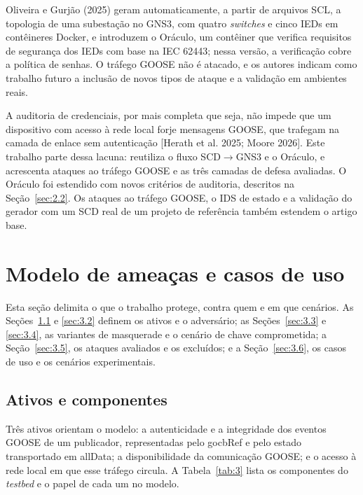 \documentclass[12pt]{article}
\newcommand{\cit}[2]{[#1]\nocite{#2}}
\newcommand{\citn}[2]{#1\nocite{#2}}
\begin{document}
\citn{Oliveira e Gurjão (2025)}{oliveira2025analisador} geram automaticamente, a partir de arquivos SCL, a topologia de uma subestação no GNS3, com quatro \emph{switches} e cinco IEDs em contêineres Docker, e introduzem o Oráculo, um contêiner que verifica requisitos de segurança dos IEDs com base na IEC 62443; nessa versão, a verificação cobre a política de senhas. O tráfego GOOSE não é atacado, e os autores indicam como trabalho futuro a inclusão de novos tipos de ataque e a validação em ambientes reais.

A auditoria de credenciais, por mais completa que seja, não impede que um dispositivo com acesso à rede local forje mensagens GOOSE, que trafegam na camada de enlace sem autenticação \cit{Herath et al. 2025; Moore 2026}{herath2025evaluation,moore2026anomaly}. Este trabalho parte dessa lacuna: reutiliza o fluxo SCD\ensuremath{\rightarrow}GNS3 e o Oráculo, e acrescenta ataques ao tráfego GOOSE e as três camadas de defesa avaliadas. O Oráculo foi estendido com novos critérios de auditoria, descritos na Seção~\ref{sec:2.2}. Os ataques ao tráfego GOOSE, o IDS de estado e a validação do gerador com um SCD real de um projeto de referência também estendem o artigo base.

\section{Modelo de ameaças e casos de uso}\label{sec:3}

Esta seção delimita o que o trabalho protege, contra quem e em que cenários. As Seções~\ref{sec:3.1} e \ref{sec:3.2} definem os ativos e o adversário; as Seções~\ref{sec:3.3} e \ref{sec:3.4}, as variantes de masquerade e o cenário de chave comprometida; a Seção~\ref{sec:3.5}, os ataques avaliados e os excluídos; e a Seção~\ref{sec:3.6}, os casos de uso e os cenários experimentais.

\subsection{Ativos e componentes}\label{sec:3.1}

Três ativos orientam o modelo: a autenticidade e a integridade dos eventos GOOSE de um publicador, representadas pelo gocbRef e pelo estado transportado em allData; a disponibilidade da comunicação GOOSE; e o acesso à rede local em que esse tráfego circula. A Tabela~\ref{tab:3} lista os componentes do \emph{testbed} e o papel de cada um no modelo.
\end{document}
